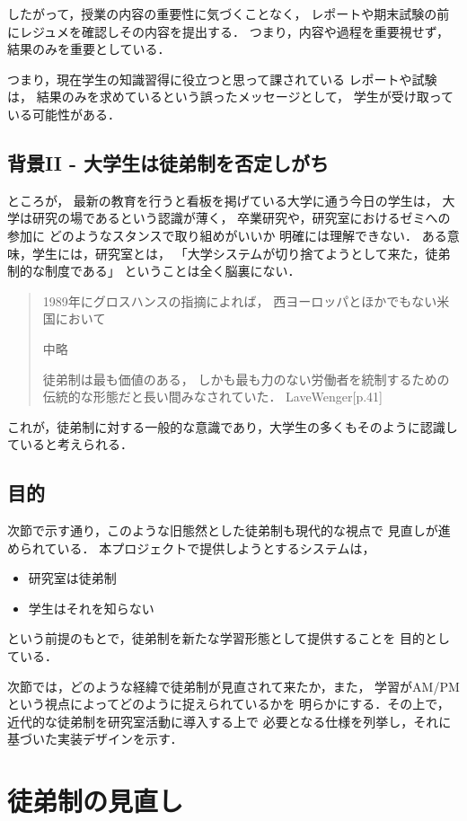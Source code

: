 \documentclass[a4,p11]{article}
\begin{document}
したがって，授業の内容の重要性に気づくことなく，
レポートや期末試験の前にレジュメを確認しその内容を提出する．
つまり，内容や過程を重要視せず，結果のみを重要としている．

つまり，現在学生の知識習得に役立つと思って課されている
レポートや試験は，
結果のみを求めているという誤ったメッセージとして，
学生が受け取っている可能性がある．

\subsection{背景II - 大学生は徒弟制を否定しがち}
\label{sec:org126bd32}
ところが，
最新の教育を行うと看板を掲げている大学に通う今日の学生は，
大学は研究の場であるという認識が薄く，
卒業研究や，研究室におけるゼミへの参加に
どのようなスタンスで取り組めがいいか
明確には理解できない．
ある意味，学生には，研究室とは，
「大学システムが切り捨てようとして来た，徒弟制的な制度である」
ということは全く脳裏にない．
\begin{quote}
1989年にグロスハンスの指摘によれば，
西ヨーロッパとほかでもない米国において

中略

徒弟制は最も価値のある，
しかも最も力のない労働者を統制するための伝統的な形態だと長い間みなされていた．
LaveWenger[p.41]
\end{quote}
これが，徒弟制に対する一般的な意識であり，大学生の多くもそのように認識していると考えられる．

\subsection{目的}
\label{sec:org0f98241}
次節で示す通り，このような旧態然とした徒弟制も現代的な視点で
見直しが進められている．
本プロジェクトで提供しようとするシステムは，
\begin{itemize}
\item 研究室は徒弟制
\item 学生はそれを知らない
\end{itemize}
という前提のもとで，徒弟制を新たな学習形態として提供することを
目的としている．

次節では，どのような経緯で徒弟制が見直されて来たか，また，
学習がAM/PMという視点によってどのように捉えられているかを
明らかにする．その上で，近代的な徒弟制を研究室活動に導入する上で
必要となる仕様を列挙し，それに基づいた実装デザインを示す．

\section{徒弟制の見直し}
\label{sec:org61572f4}
\end{document}

